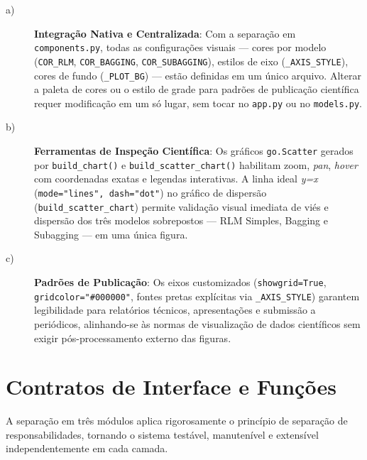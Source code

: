 \begin{description}

\item[a)] \textbf{Integração Nativa e Centralizada}: Com a separação em
\texttt{components.py}, todas as configurações visuais — cores por modelo
(\texttt{COR\_RLM}, \texttt{COR\_BAGGING}, \texttt{COR\_SUBAGGING}), estilos de eixo
(\texttt{\_AXIS\_STYLE}), cores de fundo (\texttt{\_PLOT\_BG}) — estão definidas em um
único arquivo. Alterar a paleta de cores ou o estilo de grade para padrões de publicação
científica requer modificação em um só lugar, sem tocar no \texttt{app.py} ou no
\texttt{models.py}.

\item[b)] \textbf{Ferramentas de Inspeção Científica}: Os gráficos \texttt{go.Scatter}
gerados por \texttt{build\_chart()} e \texttt{build\_scatter\_chart()} habilitam zoom,
\textit{pan}, \textit{hover} com coordenadas exatas e legendas interativas. A linha ideal
\textit{y=x} (\texttt{mode="lines", dash="dot"}) no gráfico de dispersão
(\texttt{build\_scatter\_chart}) permite validação visual imediata de viés e dispersão
dos três modelos sobrepostos — RLM Simples, Bagging e Subagging — em uma única figura.

\item[c)] \textbf{Padrões de Publicação}: Os eixos customizados (\texttt{showgrid=True},
\texttt{gridcolor="\#000000"}, fontes pretas explícitas via \texttt{\_AXIS\_STYLE})
garantem legibilidade para relatórios técnicos, apresentações e submissão a periódicos,
alinhando-se às normas de visualização de dados científicos sem exigir pós-processamento
externo das figuras.

\end{description}

\section{Contratos de Interface e Funções}
\label{sec:contratos}

A separação em três módulos aplica rigorosamente o princípio de separação de
responsabilidades, tornando o sistema testável, manutenível e extensível
independentemente em cada camada.

